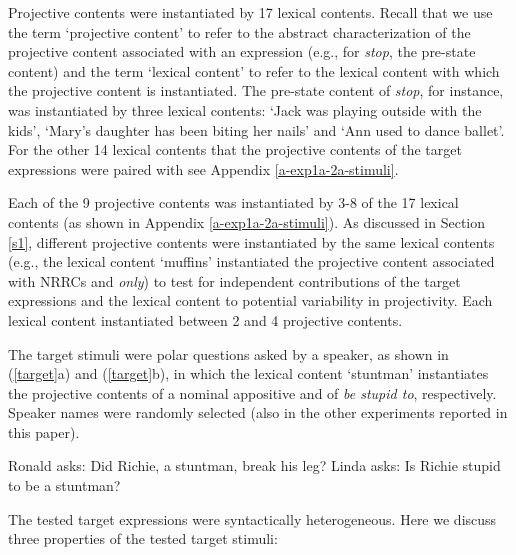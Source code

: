 \documentclass[11pt,fleqn]{article}
\newcommand{\6}{\mbox{$[\hspace*{-.6mm}[$}}
\newcommand{\9}{\mbox{$]\hspace*{-.6mm}]$}}
\newcommand{\sectionref}[1]{Section \ref{#1}}
\begin{document}
Projective contents were instantiated by 17 lexical contents. Recall that we use the term `projective content' to refer to the abstract characterization of the projective content associated with an expression (e.g., for {\em stop}, the pre-state content) and the term `lexical content' to refer to the lexical content with which the projective content is instantiated. The pre-state content of {\em stop}, for instance, was instantiated by three lexical contents: `Jack was playing outside with the kids', `Mary's daughter has been biting her nails' and `Ann used to dance ballet'. For the other 14 lexical contents that the projective contents of the target expressions were paired with see Appendix \ref{a-exp1a-2a-stimuli}.

Each of the 9 projective contents was instantiated by 3-8 of the 17 lexical contents (as shown in Appendix \ref{a-exp1a-2a-stimuli}). As discussed in \sectionref{s1}, different projective contents were instantiated by the same lexical contents (e.g., the lexical content `muffins' instantiated the projective content associated with NRRCs and {\em only}) to test for independent contributions of the target expressions and the lexical content to potential variability in projectivity. Each lexical content instantiated between 2 and 4 projective contents.

The target stimuli were polar questions asked by a speaker, as shown in (\ref{target}a) and (\ref{target}b), in which the lexical content `stuntman' instantiates the projective contents of a nominal appositive and of {\em be stupid to}, respectively. Speaker names were randomly selected (also in the other experiments reported in this paper).

\begin{exe}
\ex\label{target}
\begin{xlist}
\ex Ronald asks: Did Richie, a stuntman, break his leg?
\ex Linda asks: Is Richie stupid to be a stuntman?
\end{xlist}
\end{exe}

The tested target expressions were syntactically heterogeneous. Here we discuss three properties of the tested target stimuli:
\end{document}

